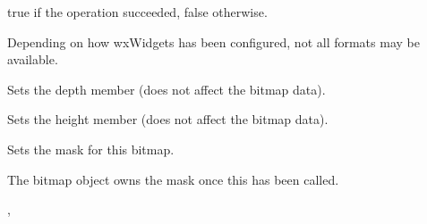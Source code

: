 

true if the operation succeeded, false otherwise.


Depending on how wxWidgets has been configured, not all formats may be available.



\label{wxbitmapsetdepth}


Sets the depth member (does not affect the bitmap data).



\label{wxbitmapsetheight}


Sets the height member (does not affect the bitmap data).



\label{wxbitmapsetmask}


Sets the mask for this bitmap.


The bitmap object owns the mask once this has been called.


, 


\label{wxbitmapsetpalette}

